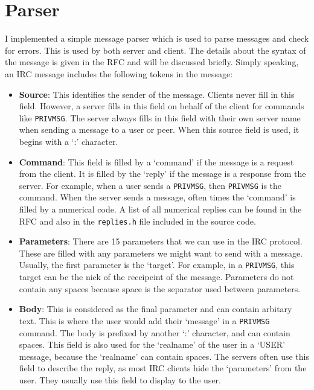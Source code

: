 \documentclass[letterpaper,twocolumn,10pt]{article}
\begin{document}
\begin{itemize}
\end{itemize}

\section{Parser}

I implemented a simple message parser which is used to parse messages and check
for errors. This is used by both server and client. The details about the
syntax of the message is given in the RFC and will be discussed briefly.
Simply speaking, an IRC message includes the following tokens in the message:

\begin{itemize}

    \item \textbf{Source}: This identifies the sender of the message. Clients never fill
	      in this
	      field. However, a server fills in this field on behalf of the client
	      for
	      commands like \verb|PRIVMSG|. The server always fills in this field
	      with their
	      own server name when sending a message to a user or peer. When this
	      source
	      field is used, it begins with a `:' character.
	\item \textbf{Command}: This field is filled by a `command' if the message is a
	      request from
	      the client. It is filled by the `reply' if the message is a response
	      from the
	      server. For example, when a user sends a \verb|PRIVMSG|, then
	      \verb|PRIVMSG| is
	      the command. When the server sends a message, often times the `command'
	      is
	      filled by a numerical code. A list of all numerical replies can be
	      found in the
	      RFC and also in the \verb|replies.h| file included in the source code.
	\item \textbf{Parameters}: There are 15 parameters that we can use in the IRC
	      protocol.
	      These are filled with any parameters we might want to send with a
	      message.
	      Usually, the first parameter is the `target'. For example, in a
	      \verb|PRIVMSG|,
	      this target can be the nick of the receipeint of the message.
	      Parameters do not
	      contain any spaces because space is the separator used between
	      parameters.
	\item \textbf{Body}: This is considered as the final parameter and can contain
	      arbitary
	      text. This is where the user would add their `message' in a
	      \verb|PRIVMSG|
	      command. The body is prefixed by another `:' character, and can contain
	      spaces.
	      This field is also used for the `realname' of the user in a `USER'
	      message,
	      because the `realname' can contain spaces. The servers often use this
	      field to
	      describe the reply, as most IRC clients hide the `parameters' from the
	      user.
	      They usually use this field to display to the user.

\end{itemize}
\end{document}
